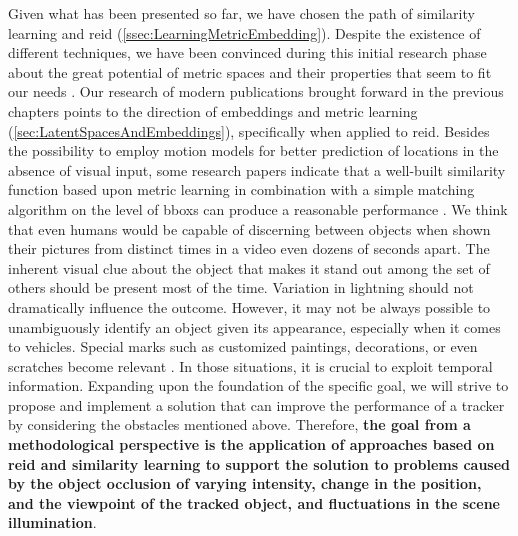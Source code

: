 Given what has been presented so far, we have chosen the path of similarity learning and \gls{reid} (\cref{ssec:LearningMetricEmbedding}). Despite the existence of different techniques, we have been convinced during this initial research phase about the great potential of metric spaces and their properties that seem to fit our needs \cite{Liu2016}. Our research of modern publications brought forward in the previous chapters points to the direction of embeddings and metric learning (\cref{sec:LatentSpacesAndEmbeddings}), specifically when applied to \gls{reid}. Besides the possibility to employ motion models for better prediction of locations in the absence of visual input, some research papers indicate that a well-built similarity function based upon metric learning in combination with a simple matching algorithm on the level of \glspl{bbox} can produce a reasonable performance \cite{Tao2016}. We think that even humans would be capable of discerning between objects when shown their pictures from distinct times in a video even dozens of seconds apart. The inherent visual clue about the object that makes it stand out among the set of others should be present most of the time. Variation in lightning should not dramatically influence the outcome. However, it may not be always possible to unambiguously identify an object given its appearance, especially when it comes to vehicles. Special marks such as customized paintings, decorations, or even scratches become relevant \cite{Liu2016}. In those situations, it is crucial to exploit temporal information. Expanding upon the foundation of the specific goal, we will strive to propose and implement a solution that can improve the performance of a tracker by considering the obstacles mentioned above. Therefore, \textbf{the goal from a methodological perspective is the application of approaches based on \gls{reid} and similarity learning to support the solution to problems caused by the object occlusion of varying intensity, change in the position, and the viewpoint of the tracked object, and fluctuations in the scene illumination}.

